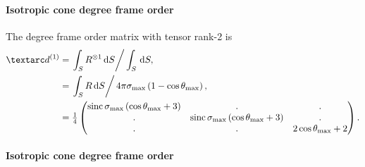 \paragraph{Isotropic cone  degree frame order}

The  degree frame order matrix with tensor rank-2 is
\begin{subequations} \label{eq: iso cone 1st degree frame order matrix}
\begin{align}
    \FOone &= \left. \int_S R^{\otimes 1} \diff S \right / \int_S \diff S , \\
           &= \left. \int_S R \diff S \right / 4\pi \conesmax \left( 1 - \cos\conethetamax \right) , \\
           &= \quart \begin{pmatrix}
                  \sinc\conesmax \left( \cos\conethetamax + 3 \right) & .                                                   & . \\
                  .                                                   & \sinc\conesmax \left( \cos\conethetamax + 3 \right) & . \\
                  .                                                   & .                                                   & 2\cos\conethetamax + 2 \\
              \end{pmatrix} .
\end{align}
\end{subequations}


\paragraph{Isotropic cone  degree frame order}

